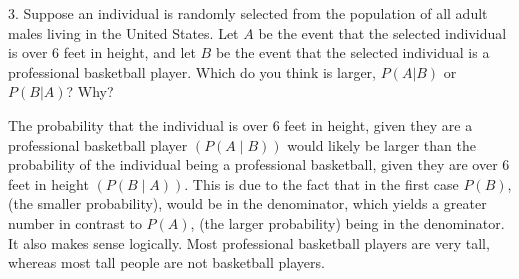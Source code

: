 \documentclass{report}
\begin{document}
    \pagebreak \bigbreak \noindent  
    \begin{mdframed}
        3. Suppose an individual is randomly selected from the population of all adult males living in the United States. Let \(A\) be the event that the selected individual is over 6 feet in height, and let \(B\) be the event that the selected individual is a professional basketball player. Which do you think is larger, \(P(A|B)\) or \(P(B|A)\)? Why?
    \end{mdframed}
    \bigbreak \noindent 
    The probability that the individual is over 6 feet in height, given they are a professional basketball player $(P(A \mid B))$ would likely be larger than the probability of the individual being a professional basketball, given they are over 6 feet in height $(P(B \mid A))$. This is due to the fact that in the first case $P(B)$, (the smaller probability), would be in the denominator, which yields a greater number in contrast to $P(A)$, (the larger probability) being in the denominator.
    \bigbreak \noindent 
    It also makes sense logically. Most professional basketball players are very tall, whereas most tall people are not basketball players.
\end{document}
